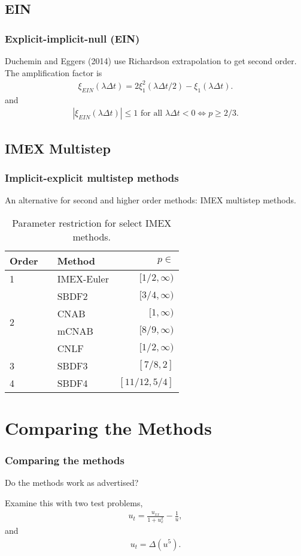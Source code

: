 \documentclass[hyperref={pdfpagelabels=false}]{beamer}
\begin{document}
\subsection{EIN} 
\begin{frame}
	\frametitle{Explicit-implicit-null (EIN)} 
Duchemin and Eggers (2014) use Richardson extrapolation to get second order. The amplification factor is  
	\begin{align*}
		\xi_{EIN}(\lambda\Delta t) 
		= 2\xi^2_1(\lambda\Delta t/2) - \xi_1(\lambda\Delta t).
	\end{align*}
and 
	\begin{align*}
		\left\vert \xi_{EIN}(\lambda\Delta t) \right\vert \leq 1 \text{ for all } \lambda\Delta t < 0 \iff p \geq 2/3.
	\end{align*}
\end{frame}

\subsection{IMEX Multistep}
\begin{frame}
	\frametitle{Implicit-explicit multistep methods}
An alternative for second and higher order methods: IMEX multistep methods.
\vspace{-10pt}
\begin{table}[htb!]
	\centering  
	\caption{Parameter restriction for select IMEX methods.}
	\begin{tabular}{lllr}
		\toprule
		Order && Method & $p\in$
		\\ \midrule 
		1 && IMEX-Euler & $[1/2,\infty)$ 
		\\ \cmidrule{1-3}
		\multirow{4}{*}{2} && SBDF2 & $[3/4,\infty)$
		\\
		&& CNAB & $[1,\infty)$ 
		\\
		&& mCNAB & $[8/9,\infty)$ 
		\\
		&& CNLF & $[1/2,\infty)$
		\\ \cmidrule{1-3}
		3 && SBDF3 & $[7/8,2]$ 
		\\ \cmidrule{1-3}
		4 && SBDF4 & $[11/12,5/4]$
		\\
		\bottomrule
	\end{tabular}
\end{table}
\end{frame}

\section{Comparing the Methods} 
\begin{frame}
	\frametitle{Comparing the methods}
Do the methods work as advertised? 	

Examine this with two test problems,
	\begin{align*}
		u_t = \frac{u_{xx}}{1 + u_x^2} - \frac{1}{u}, 
	\end{align*}
and 
	\begin{align*}
		u_t = \Delta(u^5).
	\end{align*}
\end{frame}
\end{document}
